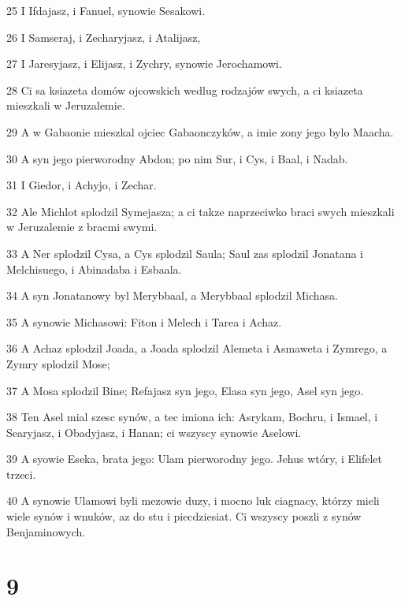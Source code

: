 \par 25 I Ifdajasz, i Fanuel, synowie Sesakowi.
\par 26 I Samseraj, i Zecharyjasz, i Atalijasz,
\par 27 I Jaresyjasz, i Elijasz, i Zychry, synowie Jerochamowi.
\par 28 Ci sa ksiazeta domów ojcowskich wedlug rodzajów swych, a ci ksiazeta mieszkali w Jeruzalemie.
\par 29 A w Gabaonie mieszkal ojciec Gabaonczyków, a imie zony jego bylo Maacha.
\par 30 A syn jego pierworodny Abdon; po nim Sur, i Cys, i Baal, i Nadab.
\par 31 I Giedor, i Achyjo, i Zechar.
\par 32 Ale Michlot splodzil Symejasza; a ci takze naprzeciwko braci swych mieszkali w Jeruzalemie z bracmi swymi.
\par 33 A Ner splodzil Cysa, a Cys splodzil Saula; Saul zas splodzil Jonatana i Melchisuego, i Abinadaba i Esbaala.
\par 34 A syn Jonatanowy byl Merybbaal, a Merybbaal splodzil Michasa.
\par 35 A synowie Michasowi: Fiton i Melech i Tarea i Achaz.
\par 36 A Achaz splodzil Joada, a Joada splodzil Alemeta i Asmaweta i Zymrego, a Zymry splodzil Mose;
\par 37 A Mosa splodzil Bine; Refajasz syn jego, Elasa syn jego, Asel syn jego.
\par 38 Ten Asel mial szesc synów, a tec imiona ich: Asrykam, Bochru, i Ismael, i Searyjasz, i Obadyjasz, i Hanan; ci wszyscy synowie Aselowi.
\par 39 A syowie Eseka, brata jego: Ulam pierworodny jego. Jehus wtóry, i Elifelet trzeci.
\par 40 A synowie Ulamowi byli mezowie duzy, i mocno luk ciagnacy, którzy mieli wiele synów i wnuków, az do stu i piecdziesiat. Ci wszyscy poszli z synów Benjaminowych.

\chapter{9}

